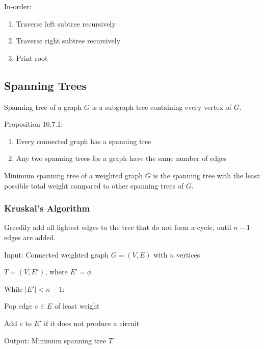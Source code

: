 \documentclass[12pt, a4paper]{article}
\begin{document}
\begin{multicols*}{3}
In-order:
\begin{enumerate}[\roman*.]
  \item Traverse left subtree recursively
  \item Traverse right subtree recursively
  \item Print root
\end{enumerate}
\subsection{Spanning Trees}
Spanning tree of a graph $G$ is a subgraph tree containing every vertex of $G$.

Proposition 10.7.1:
\begin{enumerate}[\roman*.]
  \item Every connected graph has a spanning tree
  \item Any two spanning trees for a graph have the same number of edges
\end{enumerate}

Minimum spanning tree of a weighted graph $G$ is the spanning tree with the least possible total weight compared to other spanning trees of $G$.
\colbreak
\subsubsection{Kruskal's Algorithm}
Greedily add all lightest edges to the tree that do not form a cycle, until $n-1$ edges are added.
\begin{enumproof}[parsep=0em]
  \item Input: Connected weighted graph $G = (V, E)$ with $n$ vertices
  \item $T = (V, E')$, where $E' = \phi$
  \item While $|E'| < n - 1$:
    \begin{enumproof}[parsep=0em]
    \item Pop edge $e \in E$ of least weight
    \item Add $e$ to $E'$ if it does not produce a circuit
    \end{enumproof}
  \item Output: Minimum spanning tree $T$
\end{enumproof}


\end{multicols*}
\end{document}
